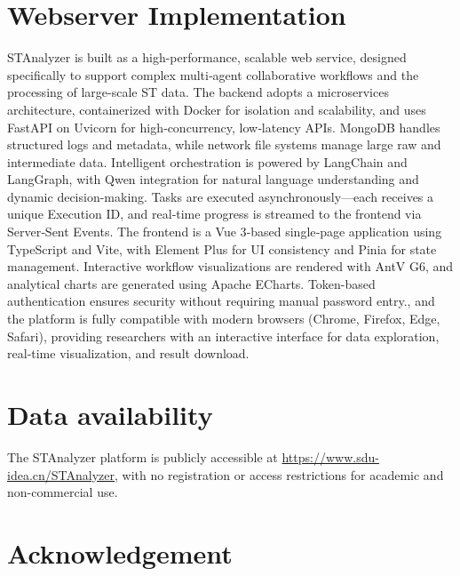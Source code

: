 \documentclass[a4,center,fleqn]{NAR}
\begin{document}
\section{Webserver Implementation}
STAnalyzer is built as a high-performance, scalable web service, designed specifically to support complex multi‑agent collaborative workflows and the processing of large-scale ST data. The backend adopts a microservices architecture, containerized with Docker for isolation and scalability, and uses FastAPI on Uvicorn for high‑concurrency, low‑latency APIs. MongoDB handles structured logs and metadata, while network file systems manage large raw and intermediate data. Intelligent orchestration is powered by LangChain and LangGraph, with Qwen integration for natural language understanding and dynamic decision-making. Tasks are executed asynchronously—each receives a unique Execution ID, and real‑time progress is streamed to the frontend via Server‑Sent Events. The frontend is a Vue 3‑based single‑page application using TypeScript and Vite, with Element Plus for UI consistency and Pinia for state management. Interactive workflow visualizations are rendered with AntV G6, and analytical charts are generated using Apache ECharts. Token-based authentication ensures security without requiring manual password entry., and the platform is fully compatible with modern browsers (Chrome, Firefox, Edge, Safari), providing researchers with an interactive interface for data exploration, real‑time visualization, and result download.

\section{Data availability}
The STAnalyzer platform is publicly accessible at \href{https://www.sdu-idea.cn/STAnalyzer}{https://www.sdu-idea.cn/STAnalyzer}, with no registration or access restrictions for academic and non-commercial use.



\section{Acknowledgement}
\end{document}
